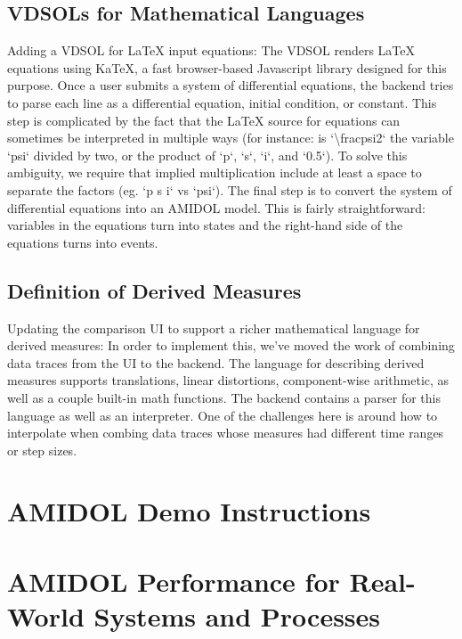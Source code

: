 \documentclass[12pt]{galois-whitepaper}
\begin{document}
\subsection{VDSOLs for Mathematical Languages}

Adding a VDSOL for LaTeX input equations: The VDSOL renders LaTeX
equations using KaTeX, a fast browser-based Javascript library
designed for this purpose. Once a user submits a system of
differential equations, the backend tries to parse each line as a
differential equation, initial condition, or constant. This step is
complicated by the fact that the LaTeX source for equations can
sometimes be interpreted in multiple ways (for instance: is
`\textbackslash frac{psi}{2}` the variable `psi` divided by two, or the product of `p`, `s`, `i`, and `0.5`). To solve this ambiguity, we require that implied multiplication include at least a space to separate the factors (eg. `p s i` vs `psi`). The final step is to convert the system of differential equations into an AMIDOL model. This is fairly straightforward: variables in the equations turn into states and the right-hand side of the equations turns into events.

\subsection{Definition of Derived Measures}

Updating the comparison UI to support a richer mathematical language for derived measures:  In order to implement this, we’ve moved the work of combining data traces from the UI to the backend. The language for describing derived measures supports translations, linear distortions, component-wise arithmetic, as well as a couple built-in math functions. The backend contains a parser for this language as well as an interpreter. One of the challenges here is around how to interpolate when combing data traces whose measures had different time ranges or step sizes.

\section{AMIDOL Demo Instructions}

\section{AMIDOL Performance for Real-World Systems and Processes}
\end{document}
